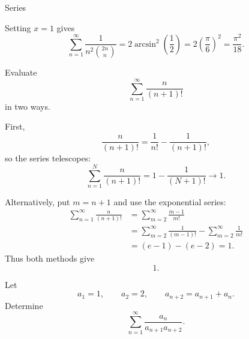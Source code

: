 \begin{expectedproblemgroup}{Series}
\begin{expectedsubsolution}
            Setting $x=1$ gives
            \[
                \sum_{n=1}^{\infty}
                \frac{1}{n^2\binom{2n}{n}}
                =
                2\arcsin^2\left(\frac12\right)
                =
                2\left(\frac{\pi}{6}\right)^2
                =
                \boxed{\frac{\pi^2}{18}}.
            \]
        \end{expectedsubsolution}

        \begin{expectedsubproblem}
            Evaluate
            \[
                \sum_{n=1}^{\infty}\frac{n}{(n+1)!}
            \]
            in two ways.
        \end{expectedsubproblem}

        \begin{expectedsubsolution}
            First,
            \[
                \frac{n}{(n+1)!}
                =
                \frac{1}{n!}-\frac{1}{(n+1)!},
            \]
            so the series telescopes:
            \[
                \sum_{n=1}^{N}\frac{n}{(n+1)!}
                =
                1-\frac{1}{(N+1)!}
                \longrightarrow
                1.
            \]

            Alternatively, put $m=n+1$ and use the exponential series:
            \[
                \begin{aligned}
                    \sum_{n=1}^{\infty}\frac{n}{(n+1)!}
                    &=
                    \sum_{m=2}^{\infty}\frac{m-1}{m!}\\
                    &=
                    \sum_{m=2}^{\infty}\frac{1}{(m-1)!}
                    -
                    \sum_{m=2}^{\infty}\frac{1}{m!}\\
                    &=
                    (e-1)-(e-2)=1.
                \end{aligned}
            \]
            Thus both methods give
            \[
                \boxed{1}.
            \]
        \end{expectedsubsolution}

        \begin{expectedsubproblem}[1998 CSAT]
            Let
            \[
                a_1=1,
                \qquad
                a_2=2,
                \qquad
                a_{n+2}=a_{n+1}+a_n.
            \]
            Determine
            \[
                \sum_{n=1}^{\infty}
                \frac{a_n}{a_{n+1}a_{n+2}}.
            \]
        \end{expectedsubproblem}


\end{expectedproblemgroup}
